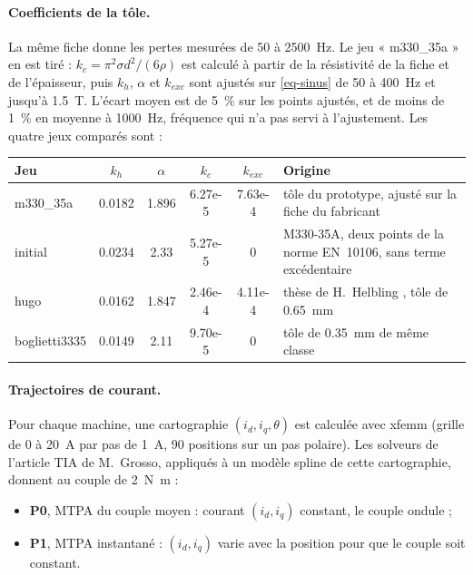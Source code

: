 \documentclass[11pt,a4paper]{article}
\begin{document}
\paragraph{Coefficients de la tôle.} La même fiche donne les pertes mesurées de 50 à \SI{2500}{\hertz}. Le jeu « m330\_35a » en est tiré : $k_c = \pi^2\sigma d^2/(6\rho)$ est calculé à partir de la résistivité de la fiche et de l'épaisseur, puis $k_h$, $\alpha$ et $k_{exc}$ sont ajustés sur \eqref{eq-sinus} de 50 à \SI{400}{\hertz} et jusqu'à \SI{1.5}{\tesla}. L'écart moyen est de \SI{5}{\percent} sur les points ajustés, et de moins de \SI{1}{\percent} en moyenne à \SI{1000}{\hertz}, fréquence qui n'a pas servi à l'ajustement. Les quatre jeux comparés sont :
\begin{center}\small
\begin{tabularx}{\textwidth}{@{}lS[table-format=1.4]S[table-format=1.3]S[table-format=1.2e-1]S[table-format=1.2e-1]X@{}}
\toprule
Jeu & {$k_h$} & {$\alpha$} & {$k_c$} & {$k_{exc}$} & Origine \\
\midrule
m330\_35a & 0.0182 & 1.896 & 6.27e-5 & 7.63e-4 & tôle du prototype, ajusté sur la fiche du fabricant \cite{Sur09} \\
initial & 0.0234 & 2.33 & 5.27e-5 & 0 & M330-35A, deux points de la norme EN~10106, sans terme excédentaire \\
hugo & 0.0162 & 1.847 & 2.46e-4 & 4.11e-4 & thèse de H.~Helbling \cite{Hel21}, tôle de \SI{0.65}{\milli\metre} \\
boglietti3335 & 0.0149 & 2.11 & 9.70e-5 & 0 & tôle de \SI{0.35}{\milli\metre} de même classe \cite[table~III]{Bog03} \\
\bottomrule
\end{tabularx}
\end{center}

\paragraph{Trajectoires de courant.} Pour chaque machine, une cartographie $(i_d, i_q, \theta)$ est calculée avec xfemm (grille de 0 à \SI{20}{\ampere} par pas de \SI{1}{\ampere}, 90 positions sur un pas polaire). Les solveurs de l'article TIA de M.~Grosso, appliqués à un modèle spline de cette cartographie, donnent au couple de \SI{2}{\newton\metre} :
\begin{itemize}
    \item \textbf{P0}, MTPA du couple moyen : courant $(i_d, i_q)$ constant, le couple ondule ;
    \item \textbf{P1}, MTPA instantané : $(i_d, i_q)$ varie avec la position pour que le couple soit constant.
\end{itemize}
\end{document}
